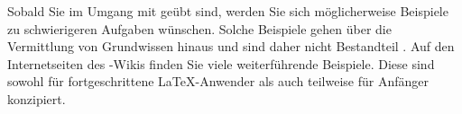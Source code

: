 Sobald Sie im Umgang mit \KOMAScript{} geübt sind, werden Sie sich
möglicherweise Beispiele zu schwierigeren Aufgaben wünschen. Solche Beispiele
gehen über die Vermittlung von Grundwissen hinaus und sind daher nicht Bestandteil . Auf den Internetseiten des \KOMAScript-Wikis \cite{wiki-de}
finden Sie viele weiterführende Beispiele. Diese sind sowohl für
fortgeschrittene \LaTeX-Anwender als auch teilweise für Anfänger
konzipiert.

\endinput

